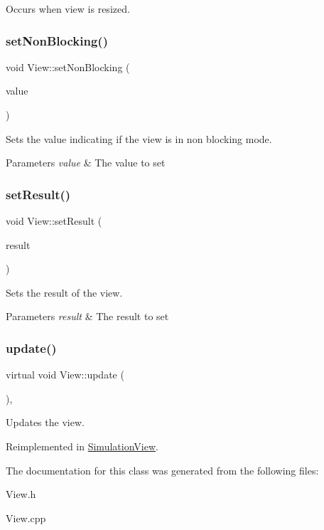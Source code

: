 Occurs when view is resized. 

\mbox{\label{class_view_ab8e4d49df156b9a22023f7992b2b9d75}} 
\subsubsection{\texorpdfstring{setNonBlocking()}{setNonBlocking()}}
{\footnotesize\ttfamily void View\+::set\+Non\+Blocking (\begin{DoxyParamCaption}\item[{bool}]{value }\end{DoxyParamCaption})}



Sets the value indicating if the view is in non blocking mode. 


\begin{DoxyParams}{Parameters}
{\em value} & The value to set\\
\hline
\end{DoxyParams}
\mbox{\label{class_view_af3d74bdf8b9775db106108e5bbf8c051}} 
\subsubsection{\texorpdfstring{setResult()}{setResult()}}
{\footnotesize\ttfamily void View\+::set\+Result (\begin{DoxyParamCaption}\item[{View\+Result}]{result }\end{DoxyParamCaption})\hspace{0.3cm}{\ttfamily [protected]}}



Sets the result of the view. 


\begin{DoxyParams}{Parameters}
{\em result} & The result to set\\
\hline
\end{DoxyParams}
\mbox{\label{class_view_aee97523bb9aaf26c1d09528e4f6911b7}} 
\subsubsection{\texorpdfstring{update()}{update()}}
{\footnotesize\ttfamily virtual void View\+::update (\begin{DoxyParamCaption}{ }\end{DoxyParamCaption})\hspace{0.3cm}{\ttfamily [inline]}, {\ttfamily [virtual]}}



Updates the view. 



Reimplemented in \mbox{\hyperlink{class_simulation_view_a6e28ca1ab7e2805561d4c3ec9e6c7d7c}{Simulation\+View}}.



The documentation for this class was generated from the following files\+:\begin{DoxyCompactItemize}
\item 
View.\+h\item 
View.\+cpp\end{DoxyCompactItemize}
